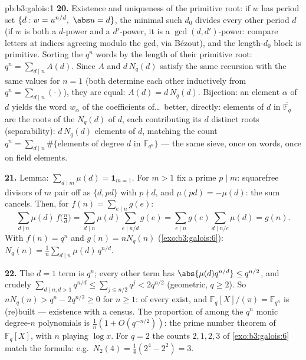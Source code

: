 \begin{solution}{pb:b3:galois:1}
\textbf{20.} Existence and uniqueness of the primitive root:
if $w$ has period set $\{d : w = u^{n/d},\ \abs u = d\}$,
the minimal such $d_0$ divides every other period $d$
(if $w$ is both a $d$-power and a $d'$-power, it is a
$\gcd(d, d')$-power: compare letters at indices agreeing
modulo the gcd, via B\'ezout), and the length-$d_0$ block is
primitive. Sorting the $q^n$ words by the length of their
primitive root: $q^n = \sum_{d \mid n}A(d)$. Since $A$ and
$d\,N_q(d)$ satisfy the same recursion with the same values
for $n = 1$ (both determine each other inductively from $q^n
= \sum_{d\mid n}(\cdot)$), they are equal: $A(d) =
d\,N_q(d)$. Bijection: an element $\alpha$ of  $d$
yields the word $w_\alpha$ of the coefficients of\dots\
better, directly: elements of  $d$ in
$\overline{\mathbb F_q}$ are the roots of the $N_q(d)$
 of  $d$, each contributing its $d$
distinct roots (separability): $d\,N_q(d)$ elements of
 $d$, matching the count $q^n = \sum_{d\mid n}\#\{
\text{elements of degree } d \text{ in } \mathbb F_{q^n}\}$
--- the same sieve, once on words, once on field elements.

\textbf{21.} Lemma: $\sum_{d \mid m}\mu(d) = \mathbf
1_{m=1}$. For $m > 1$ fix a prime $p \mid m$: squarefree
divisors of $m$ pair off as $\{d, pd\}$ with $p \nmid d$,
and $\mu(pd) = -\mu(d)$: the sum cancels. Then, for $f(n) =
\sum_{e\mid n}g(e)$:
\[
\sum_{d \mid n}\mu(d)\,f\bigl(\tfrac nd\bigr)
= \sum_{d \mid n}\mu(d)\!\!\sum_{e \mid n/d}\!\!g(e)
= \sum_{e \mid n}g(e)\!\!\sum_{d \mid n/e}\!\!\mu(d)
= g(n) .
\]
With $f(n) = q^n$ and $g(n) = nN_q(n)$
(\cref{exo:b3:galois:6}): $N_q(n) =
\frac1n\sum_{d\mid n}\mu(d)\,q^{n/d}$.

\textbf{22.} The $d = 1$ term is $q^n$; every other term has
$\abs{\mu(d)q^{n/d}} \leq q^{n/2}$, and crudely
$\sum_{d \mid n, d > 1}q^{n/d} \leq \sum_{j \leq
n/2}q^j < 2q^{n/2}$ (geometric, $q \geq 2$). So $nN_q(n) >
q^n - 2q^{n/2} \geq 0$ for $n \geq 1$:  of every
\omterm{def:b3:galois:extension}{degree} exist, and $\mathbb F_q[X]/(\pi) = \mathbb F_{q^n}$ is
(re)built --- existence with a census. The proportion of
 among the $q^n$ monic degree-$n$ polynomials is
$\frac1n(1 + O(q^{-n/2}))$: the prime number theorem of
$\mathbb F_q[X]$, with $n$ playing $\log x$. For $q = 2$ the
counts $2, 1, 2, 3$ of \cref{exo:b3:galois:6} match the
formula: e.g.\ $N_2(4) = \frac14(2^4 - 2^2) = 3$.


\end{solution}
